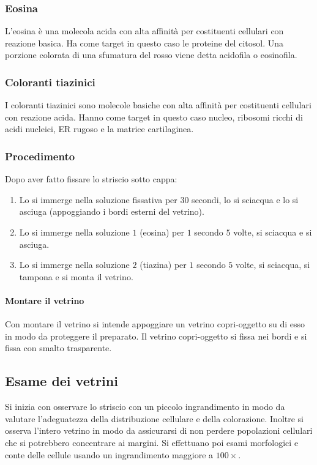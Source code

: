 		\subsubsection{Eosina}
		L'eosina \`e una molecola acida con alta affinit\`a per costituenti cellulari con reazione basica.
		Ha come target in questo caso le proteine del citosol.
		Una porzione colorata di una sfumatura del rosso viene detta acidofila o eosinofila.

		\subsubsection{Coloranti tiazinici}
		I coloranti tiazinici sono molecole basiche con alta affinit\`a per costituenti cellulari con reazione acida.
		Hanno come target in questo caso nucleo, ribosomi ricchi di acidi nucleici, ER rugoso e la matrice cartilaginea.

		\subsubsection{Procedimento}
		Dopo aver fatto fissare lo striscio sotto cappa:
		\begin{enumerate}
			\item Lo si immerge nella soluzione fissativa per $30$ secondi, lo si sciacqua e lo si asciuga (appoggiando i bordi esterni del vetrino).
			\item Lo si immerge nella soluzione $1$ (eosina) per $1$ secondo $5$ volte, si sciacqua e si asciuga.
			\item Lo si immerge nella soluzione $2$ (tiazina) per $1$ secondo $5$ volte, si sciacqua, si tampona e si monta il vetrino.
		\end{enumerate}

			\paragraph{Montare il vetrino}
			Con montare il vetrino si intende appoggiare un vetrino copri-oggetto su di esso in modo da proteggere il preparato.
			Il vetrino copri-oggetto si fissa nei bordi e si fissa con smalto trasparente. 

	\subsection{Esame dei vetrini}
	Si inizia con osservare lo striscio con un piccolo ingrandimento in modo da valutare l'adeguatezza della distribuzione cellulare e della colorazione.
	Inoltre si osserva l'intero vetrino in modo da assicurarsi di non perdere popolazioni cellulari che si potrebbero concentrare ai margini.
	Si effettuano poi esami morfologici e conte delle cellule usando un ingrandimento maggiore a $100\times$.

